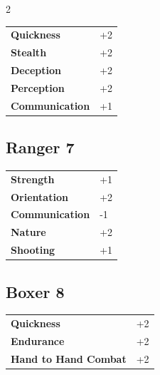 \begin{multicols}{2}
\begin{tcolorbox}
\vspace{3mm}

\begin{tabular}{@{}ll@{}}
    \textbf{Quickness} & +2\\
    \textbf{Stealth} & +2\\
    \textbf{Deception} & +2\\
    \textbf{Perception} & +2\\
    \textbf{Communication} & +1\\
\end{tabular}


\end{tcolorbox}

\begin{tcolorbox}
    \subsection*{Ranger \hfill \small{7 }}
    \tcblower




\begin{tabular}{@{}ll@{}}
    \textbf{Strength} & +1\\
    \textbf{Orientation} & +2\\
    \textbf{Communication} & -1\\
    \textbf{Nature} & +2\\
    \textbf{Shooting} & +1\\
\end{tabular}


\end{tcolorbox}

\begin{tcolorbox}
    \subsection*{Boxer \hfill \small{8 }}
    \tcblower




\begin{tabular}{@{}ll@{}}
    \textbf{Quickness} & +2\\
    \textbf{Endurance} & +2\\
    \textbf{Hand to Hand Combat} & +2\\
\end{tabular}


\end{tcolorbox}
\end{multicols}
